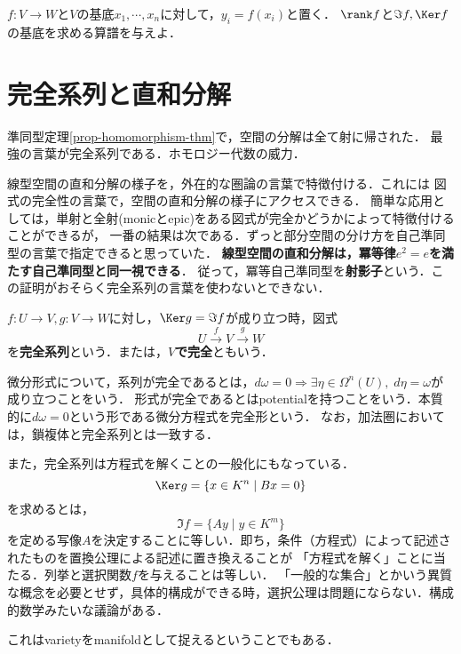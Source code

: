 \documentclass[uplatex, dvipdfmx]{jsreport}
\begin{document}
\begin{problem}
    $f:V\to W$と$V$の基底$x_1,\cdots,x_n$に対して，$y_i=f(x_i)$と置く．
    $\rank f$と$\Im f,\Ker f$の基底を求める算譜を与えよ．
\end{problem}

\section{完全系列と直和分解}

\begin{tcolorbox}[colframe=ForestGreen, colback=ForestGreen!10!white, breakable,
    title=完全系列という言葉]
    準同型定理\ref{prop-homomorphism-thm}で，空間の分解は全て射に帰された．
    最強の言葉が完全系列である．ホモロジー代数の威力．

    線型空間の直和分解の様子を，外在的な圏論の言葉で特徴付ける．これには
    図式の完全性の言葉で，空間の直和分解の様子にアクセスできる．
    簡単な応用としては，単射と全射(monicとepic)をある図式が完全かどうかによって特徴付けることができるが，
    一番の結果は次である．ずっと部分空間の分け方を自己準同型の言葉で指定できると思っていた．
    \textbf{線型空間の直和分解は，冪等律$e^2=e$を満たす自己準同型と同一視できる}．
    従って，冪等自己準同型を\textbf{射影子}という．この証明がおそらく完全系列の言葉を使わないとできない．
\end{tcolorbox}

\begin{definition}
    $f:U\to V,g:V\to W$に対し，$\Ker g=\Im f$が成り立つ時，図式
    \[ U\xrightarrow{f}V\xrightarrow{g}W \]
    を\textbf{完全系列}という．または，\textbf{$V$で完全}ともいう．
\end{definition}
\begin{remark}
    微分形式について，系列が完全であるとは，$d\omega=0\Rightarrow\exists\eta\in\Omega^n(U),\;d\eta=\omega$が成り立つことをいう．
    形式が完全であるとはpotentialを持つことをいう．本質的に$d\omega=0$という形である微分方程式を完全形という．
    なお，加法圏においては，鎖複体と完全系列とは一致する．

    また，完全系列は方程式を解くことの一般化にもなっている．
    \[\Ker g=\{x\in K^n\mid Bx=0\}\]
    を求めるとは，
    \[ \Im f=\{Ay\mid y\in K^m\} \]
    を定める写像$A$を決定することに等しい．即ち，条件（方程式）によって記述されたものを置換公理による記述に置き換えることが
    「方程式を解く」ことに当たる．列挙と選択関数$f$を与えることは等しい．
    「一般的な集合」とかいう異質な概念を必要とせず，具体的構成ができる時，選択公理は問題にならない．構成的数学みたいな議論がある．

    これはvarietyをmanifoldとして捉えるということでもある．
\end{remark}
\end{document}
